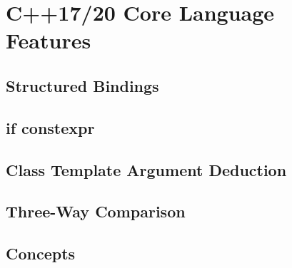 \section{C++17/20 Core Language Features}\label{sec:cpp17-20}

\subsection{Structured Bindings}

\subsection{if constexpr}

\subsection{Class Template Argument Deduction}

\subsection{Three-Way Comparison}

\subsection{Concepts}
